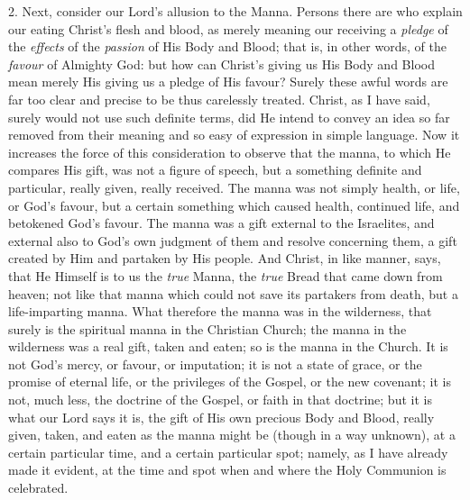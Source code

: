 2. Next, consider our Lord's allusion to the Manna. Persons there
are who explain our eating Christ's flesh and blood, as merely meaning
our receiving a \emph{pledge} of the \emph{effects} of the \emph{passion}
of His Body and Blood; that is, in other words, of the \emph{favour}
of Almighty God: but how can Christ's giving us His Body and Blood
mean merely His giving us a pledge of His favour? Surely these awful
words are far too clear and precise to be thus carelessly treated.
Christ, as I have said, surely would not use such definite terms, did
He intend to convey an idea so far removed from their meaning and so
easy of expression in simple language. Now it increases the force of
this consideration to observe that the manna, to which He compares His
gift, was not a figure of speech, but a something definite and
particular, really given, really received. The manna was not simply
health, or life, or God's favour, but a certain something which caused
health, continued life, and betokened God's favour. The manna was a
gift external to the Israelites, and external also to God's own
judgment of them and resolve concerning them, a gift created by Him
and partaken by His people. And Christ, in like manner, says, that He
Himself is to us the \emph{true} Manna, the \emph{true} Bread that
came down from heaven; not like that manna which could not save its
partakers from death, but a life-imparting manna. What therefore the
manna was in the wilderness, that surely is the spiritual manna in the
Christian Church; the manna in the wilderness was a real gift, taken
and eaten; so is the manna in the Church. It is not God's mercy, or
favour, or imputation; it is not a state of grace, or the promise of
eternal life, or the privileges of the Gospel, or the new covenant; it
is not, much less, the doctrine of the Gospel, or faith in that
doctrine; but it is what our Lord says it is, the gift of His own
precious Body and Blood, really given, taken, and eaten as the manna
might be (though in a way unknown), at a certain particular time, and
a certain particular spot; namely, as I have already made it evident,
at the time and spot when and where the Holy Communion is celebrated.

